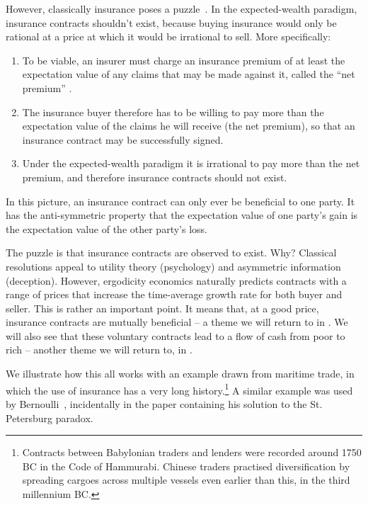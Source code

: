 However, classically insurance poses a puzzle~\cite{PetersAdamou2015b}. In 
the expected-wealth paradigm, insurance contracts shouldn't exist, because 
buying insurance would only be rational at a price at which it would be irrational 
to sell. More specifically:
\begin{enumerate}
\item To be viable, an insurer must charge an insurance premium of at least the 
expectation value of any claims that may be made against it, called the ``net 
premium'' \cite[p.~1]{KaasETAL2008}.
\item The insurance buyer therefore has to be willing to pay more than the expectation
value of the claims he will receive (the net premium), so that an insurance contract 
may be successfully signed.
\item Under the expected-wealth paradigm it is irrational to pay more than the 
net premium, and therefore insurance contracts should not exist.
\end{enumerate}
In this picture, an insurance contract can only ever be beneficial to one party. It 
has the anti-symmetric property that the expectation value of one party's gain is 
the expectation value of the other party's loss.

The puzzle is that insurance contracts are observed to exist. Why? Classical 
resolutions appeal to utility 
theory (\ie psychology) and asymmetric information (\ie deception). However, 
ergodicity economics naturally predicts contracts with a range of prices that 
increase the time-average growth rate for both buyer and seller. 
This is rather an important point. It means that, at a good price, insurance 
contracts are mutually beneficial -- a theme we will return to in . 
We will also see that these voluntary contracts lead to a flow of cash from 
poor to rich -- another theme we will return to, in .

We illustrate how this all works with an example drawn from maritime trade, in 
which the use of insurance 
has a very long history.\footnote{Contracts between Babylonian traders and 
lenders were recorded around 1750 BC in the Code of Hammurabi. Chinese 
traders practised diversification by spreading cargoes across multiple vessels 
even earlier than this, in the third millennium BC.} A similar 
example was used by Bernoulli~\cite{Bernoulli1738}, incidentally in the
paper containing his solution to the St. Petersburg paradox.

